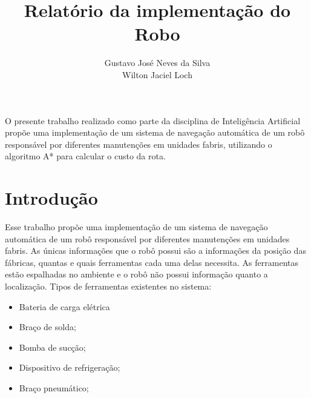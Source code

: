 \documentclass[12pt]{article}
\title{Relatório da implementação do Robo}
\author{Gustavo José Neves da Silva\inst{1}\\Wilton Jaciel Loch\inst{1}}
\begin{document}
 

\maketitle

     
\begin{resumo}
O presente trabalho realizado como parte da disciplina de Inteligência Artificial propõe uma implementação de um sistema de navegação automática de um robô responsável por diferentes manutenções em unidades fabris, utilizando o algoritmo A* para calcular o custo da rota. 
\end{resumo}

\section{Introdução} \label{sec:Introducao}
Esse trabalho propõe uma implementação de um sistema de navegação automática de um robô responsável por diferentes manutenções em unidades fabris.
%
As únicas informações que o robô possui são a informações da posição das fábricas, quantas e quais ferramentas cada uma delas necessita.
%
As ferramentas estão espalhadas no ambiente e o robô não possui informação quanto a localização.
Tipos de ferramentas existentes no sistema:
\begin{itemize}
	\item Bateria de carga elétrica
	\item Braço de solda;
	\item Bomba de sucção;
	\item Dispositivo de refrigeração;
	\item Braço pneumático;
\end{itemize}
\end{document}
